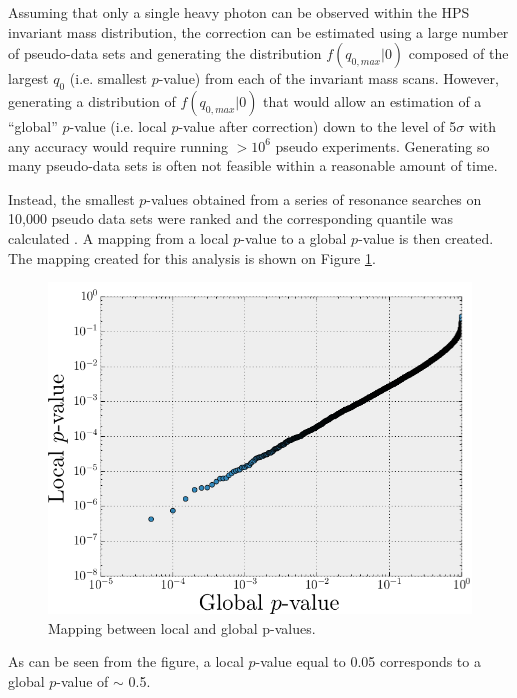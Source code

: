 Assuming that only a single heavy photon can be observed within the HPS invariant
mass distribution, the correction can be estimated using a large number
of pseudo-data sets and generating the distribution 
$f(q_{0, max} | 0)$ composed of the largest $q_{0}$ (i.e. smallest $p$-value)
from each of the invariant mass scans.
However, generating a distribution of $f(q_{0, max} | 0)$ that would allow 
an estimation of a ``global''  
$p$-value (i.e. local $p$-value after correction) down to the level of 5$\sigma$ with any accuracy would 
require running $> 10^{6}$ pseudo experiments.  Generating so many pseudo-data 
sets is often not feasible within a reasonable amount of time. 

Instead, the smallest
$p$-values obtained from a series of resonance searches on 10,000 pseudo
data sets were
ranked and the corresponding quantile was calculated \cite{Gross:2010qma}.  
A mapping from a local 
$p$-value to a global $p$-value is then created.  The mapping created 
for this analysis is shown on Figure \ref{fig:global_p_value}.
\begin{figure}[t]
    \centering
    \includegraphics[width=\textwidth]{images/global_p_value_map.png}
    \caption{Mapping between local and global p-values.}
    \label{fig:global_p_value}
\end{figure}
As can be seen from the figure, a 
local $p$-value equal to 0.05 corresponds to a global $p$-value of $\sim$ 0.5.


